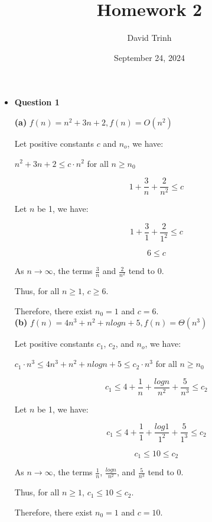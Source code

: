 \documentclass{article}
\title{Homework 2}
\author{David Trinh}
\date{September 24, 2024}
\begin{document}
\maketitle

\begin{itemize}

    \item\textbf{ Question 1}
    
    \textbf{(a)} $f(n) = n^2 + 3n + 2, f(n) = O(n^2)$

    Let positive constants $c$ and $n_o$, we have:

    \begin{center}
        $n^2 + 3n + 2 \le c\cdot n^2$ for all $n \ge n_0$
    \end{center}

    $$1 + \frac{3}{n} + \frac{2}{n^2} \le c$$

    Let $n$ be 1, we have:

    $$1 + \frac{3}{1} + \frac{2}{1^2} \le c$$

    $$6 \le c$$

    As $n \to \infty$, the terms $\frac{3}{n}$ and $\frac{2}{n^2}$ tend to $0$.

    Thus, for all $n \ge 1$, $c \ge 6$.

    Therefore, there exist $n_0 = 1$ and $c = 6$.\\

    \textbf{(b)} $f(n) = 4n^3 + n^2 + nlogn + 5, f(n) = \Theta(n^3)$
    
    Let positive constants $c_1$, $c_2$, and $n_o$, we have:

    \begin{center}
        $c_1\cdot n^3 \le 4n^3 + n^2 + nlogn + 5 \le c_2\cdot n^3$ for all $n \ge n_0$
    \end{center}

    $$c_1 \le 4 + \frac{1}{n} + \frac{logn}{n^2} + \frac{5}{n^3} \le c_2$$

    Let $n$ be 1, we have:

    $$c_1 \le 4 + \frac{1}{1} + \frac{log1}{1^2} + \frac{5}{1^3} \le c_2$$

    $$c_1 \le 10 \le c_2$$

    As $n \to \infty$, the terms $\frac{1}{n}$, $\frac{logn}{n^2}$, and $\frac{5}{n^3}$ tend to $0$.

    Thus, for all $n \ge 1$, $c_1 \le 10 \le c_2$.

    Therefore, there exist $n_0 = 1$ and $c = 10$.\\


\end{itemize}
\end{document}
